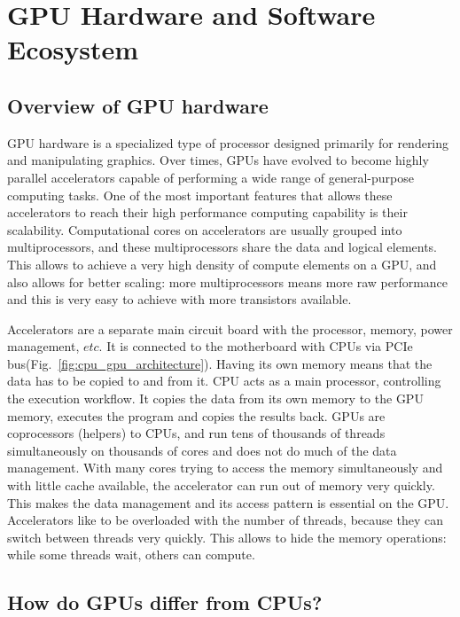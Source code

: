 \section{GPU Hardware and Software Ecosystem}


\subsection{Overview of GPU hardware}


\par
GPU hardware is a specialized type of processor designed primarily for rendering and manipulating graphics.
Over times, GPUs have evolved to become highly parallel accelerators capable of performing a wide range of general-purpose computing tasks.
One of the most important features that allows these accelerators to reach their high performance computing capability is their scalability. 
Computational cores on accelerators are usually grouped into multiprocessors, and these multiprocessors share the data and logical elements.
This allows to achieve a very high density of compute elements on a GPU, and also allows for better scaling: more multiprocessors means more raw performance and this is very easy to achieve with more transistors available.


\par
Accelerators are a separate main circuit board with the processor, memory, power management, $etc$.
It is connected to the motherboard with CPUs via PCIe bus(Fig.~\ref{fig:cpu_gpu_architecture}).
Having its own memory means that the data has to be copied to and from it.
CPU acts as a main processor, controlling the execution workflow.
It copies the data from its own memory to the GPU memory, executes the program and copies the results back.
GPUs are coprocessors (helpers) to CPUs, and run tens of thousands of threads simultaneously on thousands of cores and does not do much of the data management.
With many cores trying to access the memory simultaneously and with little cache available, the accelerator can run out of memory very quickly.
This makes the data management and its access pattern is essential on the GPU.
Accelerators like to be overloaded with the number of threads, because they can switch between threads very quickly.
This allows to hide the memory operations: while some threads wait, others can compute.




\subsection{How do GPUs differ from CPUs?}


